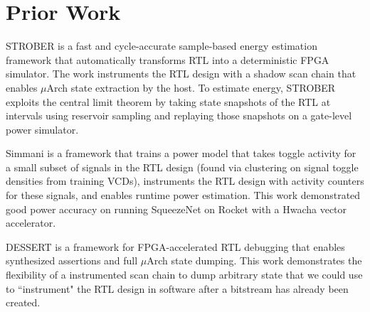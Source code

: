 \documentclass[sigconf]{acmart}
\begin{document}
\section{Prior Work}
STROBER\cite{strober} is a fast and cycle-accurate sample-based energy estimation framework that automatically transforms RTL into a deterministic FPGA simulator.
The work instruments the RTL design with a shadow scan chain that enables $\mu$Arch state extraction by the host.
To estimate energy, STROBER exploits the central limit theorem by taking state snapshots of the RTL at intervals using reservoir sampling and replaying those snapshots on a gate-level power simulator.

Simmani\cite{simmani} is a framework that trains a power model that takes toggle activity for a small subset of signals in the RTL design (found via clustering on signal toggle densities from training VCDs), instruments the RTL design with activity counters for these signals, and enables runtime power estimation.
This work demonstrated good power accuracy on running SqueezeNet on Rocket with a Hwacha vector accelerator.

DESSERT\cite{dessert} is a framework for FPGA-accelerated RTL debugging that enables synthesized assertions and full $\mu$Arch state dumping.
This work demonstrates the flexibility of a instrumented scan chain to dump arbitrary state that we could use to ``instrument" the RTL design in software after a bitstream has already been created.




\end{document}
